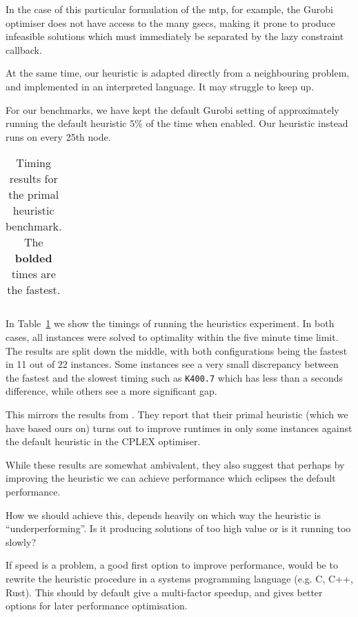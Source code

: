 In the case of this particular formulation of the \gls{mtp},
for example, the Gurobi optimiser does not have access to the
many \glspl{gsec}, making it prone to produce infeasible solutions which must immediately
be separated by the lazy constraint callback.

At the same time, our heuristic is adapted directly from a neighbouring problem,
and implemented in an interpreted language. It may struggle to keep up.

For our benchmarks, we have kept the default Gurobi setting of approximately running
the default heuristic $5\%$ of the time when enabled. Our heuristic instead runs on
every 25th node.

\begin{table}[h!]
  \centering
  \begin{tabular}[h!]{|c|c|c|c|}\hline
    
  \end{tabular}
  \caption{Timing results for the primal heuristic benchmark. The
    \textbf{bolded} times are the fastest.}
  \label{tab:jmp:heuristics}
\end{table}

In Table~\ref{tab:jmp:heuristics} we show the timings of running the heuristics experiment.
In both cases, all instances were solved to optimality within the five minute time limit.
The results are split down the middle, with both configurations being the fastest
in 11 out of 22 instances. Some instances see a very small discrepancy between the fastest
and the slowest timing such as \texttt{K400.7} which has less than a seconds difference,
while others see a more significant gap.


This mirrors the results from
\citet{ljubic2005solving}. They report that their primal heuristic (which we have based
ours on) turns out to improve runtimes in only some instances against the default heuristic
in the CPLEX optimiser.

While these results are somewhat ambivalent,
they also suggest that perhaps by improving the heuristic we can achieve performance
which eclipses the default performance.

How we should achieve this, depends heavily on which way the heuristic is ``underperforming''.
 Is it producing solutions of too high value or is it running too slowly?

 If speed is a problem, a good first option to improve performance,
 would be to rewrite the heuristic procedure
in a systems programming language (e.g. C, C++, Rust).
This should by default give a multi-factor speedup, and gives better options for
later performance optimisation.

